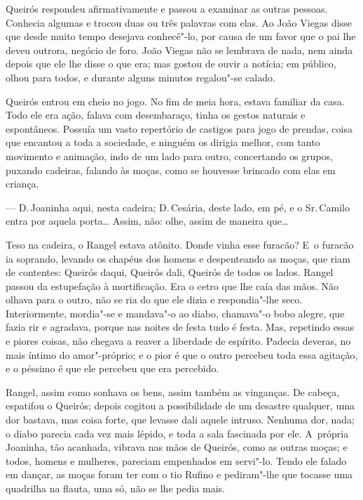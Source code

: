 \begin{linenumbers}
Queirós respondeu afirmativamente e passou a examinar as outras pessoas.
Conhecia algumas e trocou duas ou três palavras com elas. Ao João Viegas
disse que desde muito tempo desejava conhecê"-lo, por causa de um favor
que o pai lhe deveu outrora, negócio de foro. João Viegas não se
lembrava de nada, nem ainda depois que ele lhe disse o que era; mas
gostou de ouvir a notícia; em público, olhou para todos, e durante
alguns minutos regalou"-se calado.

Queirós entrou em cheio no jogo. No fim de meia hora, estava familiar da
casa. Todo ele era ação, falava com desembaraço, tinha os gestos
naturais e espontâneos. Possuía um vasto repertório de castigos para
jogo de prendas, coisa que encantou a toda a sociedade, e ninguém os
dirigia melhor, com tanto movimento e animação, indo de um lado para
outro, concertando os grupos, puxando cadeiras, falando às moças, como
se houvesse brincado com elas em criança.

--- D.\,Joaninha aqui, nesta cadeira; D.\,Cesária, deste lado, em pé, e o
Sr.\,Camilo entra por aquela porta\ldots{} Assim, não: olhe, assim de maneira
que\ldots{}

Teso na cadeira, o Rangel estava atônito. Donde vinha esse furacão? E~o
furacão ia soprando, levando os chapéus dos homens e despenteando as
moças, que riam de contentes: Queirós daqui, Queirós dali, Queirós de
todos os lados. Rangel passou da estupefação à mortificação. Era o cetro
que lhe caía das mãos. Não olhava para o outro, não se ria do que ele
dizia e respondia"-lhe seco. Interiormente, mordia"-se e mandava"-o ao
diabo, chamava"-o bobo alegre, que fazia rir e agradava, porque nas
noites de festa tudo é festa. Mas, repetindo essas e piores coisas, não
chegava a reaver a liberdade de espírito. Padecia deveras, no mais
íntimo do amor"-próprio; e o pior é que o outro percebeu toda essa
agitação, e o péssimo é que ele percebeu que era percebido.

Rangel, assim como sonhava os bens, assim também as vinganças. De
cabeça, espatifou o Queirós; depois cogitou a possibilidade de um
desastre qualquer, uma dor bastava, mas coisa forte, que levasse dali
aquele intruso. Nenhuma dor, nada; o diabo parecia cada vez mais lépido,
e toda a sala fascinada por ele. A~própria Joaninha, tão acanhada,
vibrava nas mãos de Queirós, como as outras moças; e todos, homens e
mulheres, pareciam empenhados em servi"-lo. Tendo ele falado em dançar,
as moças foram ter com o tio Rufino e pediram"-lhe que tocasse uma
quadrilha na flauta, uma só, não se lhe pedia mais.


\end{linenumbers}
